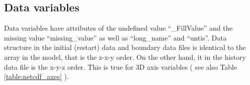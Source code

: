 \subsection{Data variables}
Data variables have attributes of the undefined value ``\_FillValue'' and 
the missing value ``missing\_value'' as well as ``long\_name'' and ``untis''.
Data structure in the initial (restart) data and boundary data files 
is identical to the array in the model, that is the z-x-y order.
On the other hand, it in the history data file is the x-y-z order.
This is true for 3D axis variables ( see also Table \ref{table:netcdf_axes} ).

